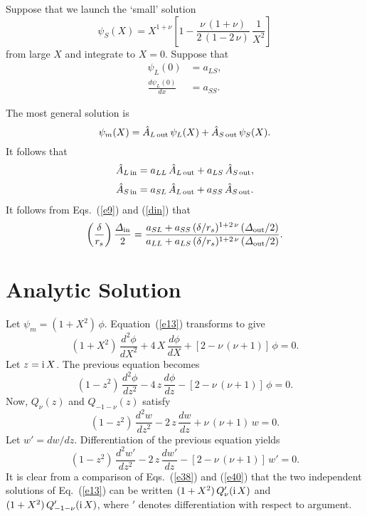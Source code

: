 \documentclass[12pt,prb,aps,notitlepage]{revtex4-1}
\begin{document}
Suppose that we launch the  `small' solution 
\begin{equation}
\psi_S(X) = X^{1+\nu}\left[1-\frac{\nu\,(1+\nu)}{2\,(1-2\,\nu)}\,\frac{1}{X^2}\right]
\end{equation}
from large $X$ and integrate to  $X=0$. Suppose that 
\begin{align}
\psi_L(0) &= a_{LS},\\[0.5ex]
\frac{d\psi_L(0)}{dx} &= a_{SS}.
\end{align}

The most general solution is
\begin{equation}
\psi_m(X) = \hat{A}_{L\,{\rm out}}\,\psi_L(X)+ \hat{A}_{S\,{\rm out}}\,\psi_S(X).
\end{equation}
It follows that
\begin{align}\label{bin}
\hat{A}_{L\,{\rm in}} &= a_{LL}\,\hat{A}_{L\,{\rm out}} + a_{LS}\,\hat{A}_{S\,{\rm out}},\\[0.5ex]
\hat{A}_{S\,{\rm in}}&= a_{SL}\,\hat{A}_{L\,{\rm out}} + a_{SS}\,\hat{A}_{S\,{\rm out}}.\label{bout}
\end{align}
It follows from Eqs.~(\ref{e9}) and (\ref{din}) that
\begin{equation}
\left(\frac{\delta}{r_s}\right)\frac{{\mit\Delta}_{\rm in}}{2}= \frac{a_{SL} +a_{SS}\,(\delta/r_s)^{1+2\,\nu}\,({\mit\Delta}_{\rm out}/2)}
{a_{LL}  +a_{LS}\,(\delta/r_s)^{1+2\,\nu}\,({\mit\Delta}_{\rm out}/2)}.
\end{equation}

\section{Analytic Solution}
Let $\psi_m = (1+X^2)\,\phi$. Equation~(\ref{e13}) transforms to give
\begin{equation}
(1+X^2)\,\frac{d^2\phi}{dX^2} + 4\,X\,\frac{d\phi}{dX} + [2-\nu\,(\nu+1)]\,\phi=0.
\end{equation}
Let $z= {\rm i}\,X$. The previous equation becomes 
\begin{equation}\label{e38}
(1-z^2)\,\frac{d^2\phi}{dz^2} - 4\,z\,\frac{d\phi}{dz} - [2-\nu\,(\nu+1)]\,\phi=0.
\end{equation}
Now, $Q_\nu(z)$ and $Q_{-1-\nu}(z)$ satisfy
\begin{equation}
(1-z^2)\,\frac{d^2 w}{dz^2} - 2\,z\,\frac{dw}{dz} + \nu\,(\nu+1)\,w = 0.
\end{equation}
Let $w'=dw/dz$. Differentiation of the previous equation yields
\begin{equation}\label{e40}
(1-z^2)\,\frac{d^2w'}{dz^2} - 2\,z\,\frac{dw'}{dz} - [2-\nu\,(\nu+1)]\,w'=0.
\end{equation}
It is clear from a comparison of Eqs.~(\ref{e38}) and (\ref{e40}) that the two independent solutions of Eq.~(\ref{e13}) can be written 
$(1+X^2)\,Q_\nu'({\rm i}\,X)$ and $(1+X^2)\,Q_{-1-\nu}'({\rm i}\,X)$, where $'$ denotes differentiation with respect to argument. 
\end{document}
